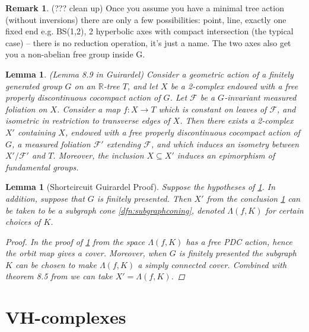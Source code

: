 \documentclass[12pt,parskip=full]{report}
\theoremstyle{plain}
\newtheorem{lem}[thm]{Lemma}
\theoremstyle{definition}
\newtheorem{rmk}[thm]{Remark}
\begin{document}
\begin{rmk}
    (??? clean up) Once you assume you have a minimal tree action (without inversions) there are only a few possibilities: point, line, exactly one fixed end e.g. BS(1,2), 2 hyperbolic axes with compact intersection (the typical case) -- there is no reduction operation, it's just a name. The two axes also get you a non-abelian free group inside G.
\end{rmk}

\begin{lem}
    \label{lem:guirardel-extension}
    (Lemma 8.9 in Guirardel)
    Consider a geometric action of a finitely generated group \(G\) on an \(\mathbb{R}\)-tree \(T\), and let \(X\) be a 2-complex endowed with a free properly discontinuous cocompact action of \(G\). Let \(\mathscr{F}\) be a \(G\)-invariant measured foliation on \(X\). Consider a map \(f: X \to T\) which is constant on leaves of \(\mathscr{F}\), and isometric in restriction to transverse edges of \(X\). Then there exists a 2-complex \( X'\) containing \(X\), endowed with a free properly discontinuous cocompact action of \(G\), a measured foliation \(\mathscr{F} '\) extending \(\mathscr{F}\), and which induces an isometry between \(X'/ \mathscr{F}'\) and \(T\). Moreover, the inclusion \(X \subseteq X'\) induces an epimorphism of fundamental groups.
\end{lem}

\begin{lem}
    [Shortcircuit Guirardel Proof] 
    \label{lem:shortcircuit} Suppose the hypotheses of \ref{lem:guirardel-extension}. In addition, suppose that $G$ is finitely presented. Then \(X'\) from the conclusion \ref{lem:guirardel-extension} can be taken to be a subgraph cone \ref{dfn:subgraphconing}, denoted \(\Lambda(f,K)\) for certain choices of \(K\).
    \begin{proof}
        In the proof of \ref{lem:guirardel-extension} from \cite{guirardelcorepaper} the space \(\Lambda(f,K)\) has a free PDC action, hence the orbit map gives a cover. Moreover, when \(G\) is finitely presented the subgraph \(K\) can be chosen to make \(\Lambda(f,K)\) a simply connected cover. Combined with theorem 8.5 from \cite{guirardelcorepaper} we can take \(X' = \Lambda(f,K)\).
    \end{proof}

\end{lem}

\section{VH-complexes}
\end{document}
